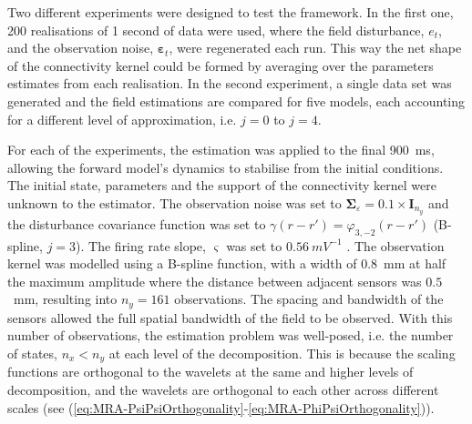 \documentclass[11pt,draftcls,onecolumn,peerreview]{IEEEtran}
\begin{document}
Two different experiments were designed to test the framework. In the first one, 200 realisations of 1 second of data were used, where the field disturbance, $e_t$, and the observation noise, $\boldsymbol\varepsilon_t$, were regenerated each run. This way the net shape of the connectivity kernel could be formed by averaging over the parameters estimates from each realisation. In the second experiment, a single data set was generated and the field estimations are compared for five models, each accounting for a different level of approximation, i.e. $j=0$ to $j=4$. 

For each of the experiments, the estimation was applied to the final 900~ms, allowing the forward model's dynamics to stabilise from the initial conditions. The initial state, parameters and the support of the connectivity kernel were unknown to the estimator. The observation noise was set to $\boldsymbol\Sigma_{\varepsilon}=0.1 \times \mathbf{I}_{n_y}$ and the disturbance covariance function was set to $\gamma(r-r') = \varphi_{3,-2}(r-r')$ (B-spline, $j=3$).  The firing rate slope, $\varsigma$ was set to $0.56~mV^{-1}$ \cite{Wendling2005}. The observation kernel was modelled using a B-spline function, with a width of 0.8~mm at half the maximum amplitude where the distance between adjacent sensors was $0.5$~mm, resulting into $n_y = 161$ observations. The spacing and bandwidth of the sensors allowed the full spatial bandwidth of the field to be observed.  With this number of observations, the estimation problem was well-posed, i.e. the number of states, $n_x < n_y$ at each level of the decomposition. This is because the scaling functions are orthogonal to the wavelets at the same and higher levels of decomposition, and  the wavelets are orthogonal to each other across different scales (see (\ref{eq:MRA-PsiPsiOrthogonality}-\ref{eq:MRA-PhiPsiOrthogonality})). 
\end{document}
